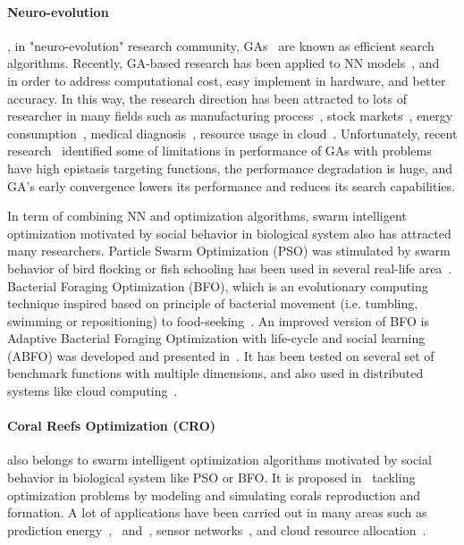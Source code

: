 \documentclass[review,3p,authoryear]{elsarticle}
\begin{document}
\paragraph{Neuro-evolution}, in "neuro-evolution" research community, GAs~\citep{ref_holland} are known as efficient search algorithms. Recently, GA-based research has been applied to NN models~\citep{ref_montana}, and~\citep{ref_whitley} in order to address computational cost, easy implement in hardware, and better accuracy. In this way, the research direction has been attracted to lots of researcher in many fields such as manufacturing process~\citep{ref_cook}, stock markets~\citep{ref_kim}, energy consumption~\citep{ref_magnier}, medical diagnosis~\citep{ref_karegowda}, resource usage in cloud~\citep{ref_thieu}. Unfortunately, recent research~\citep{ref_ramesh} identified some of limitations in performance of GAs with problems have high epistasis targeting functions, the performance degradation is huge, and GA's early convergence lowers its performance and reduces its search capabilities. 

In term of combining NN and optimization algorithms, swarm intelligent optimization motivated by social behavior in biological system also has attracted many researchers. Particle Swarm Optimization (PSO) was stimulated by swarm behavior of bird flocking or fish schooling has been used in several real-life area~\citep{ref_kennedy2011}. Bacterial Foraging Optimization (BFO), which is an evolutionary computing technique inspired based on principle of bacterial movement (i.e. tumbling, swimming or repositioning) to food-seeking~\citep{ref_passino2002}. An improved version of BFO is Adaptive Bacterial Foraging Optimization with life-cycle and social learning (ABFO) was developed and presented in~\citep{ref_yan2012}. It has been tested on several set of benchmark functions with multiple dimensions, and also used in distributed systems like cloud computing~\citep{ref_thieu2}.

\paragraph{Coral Reefs Optimization (CRO)} also belongs to swarm intelligent optimization algorithms motivated by social behavior in biological system like PSO or BFO. It is proposed in~\citep{ref_salcedo_sanz1} tackling optimization problems by modeling and simulating corals reproduction and formation. A lot of applications have been carried out in many areas such as prediction energy~\citep{ref_salcedo_sanz2},~\citep{ref_salcedo_sanz2} and~\citep{ref_salcedo_sanz4}, sensor networks~\citep{ref_li}, and cloud resource allocation~\citep{ref_ficco}. 
\end{document}
